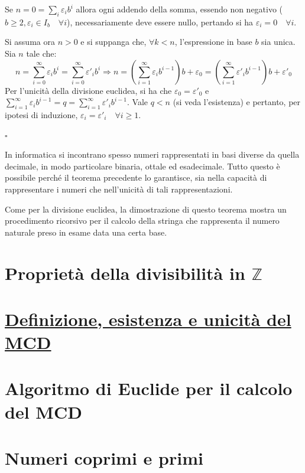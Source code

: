\documentclass[oneside]{book}
\theoremstyle{remark}
\newcommand{\cvd}{\begin{flushright}$\square$\end{flushright}} %
\begin{document}
\begin{tcolorbox}[enhanced, breakable, title={Teorema di rappresentazione dei naturali in base arbitraria}]
Se $n = 0 = \sum_{i} \varepsilon_i b^i$ allora ogni addendo della somma,
essendo non negativo ($b \geq 2, \varepsilon_i \in I_b \quad \forall i$), necessariamente deve essere nullo, pertando si
ha $\varepsilon_i = 0 \quad \forall i$.

Si assuma ora $n > 0$ e si suppanga che, $\forall k < n$, l'espressione
in base $b$ sia unica. Sia $n$ tale che:
\[
    n = \sum_{i=0}^{\infty}\varepsilon_i b^i = \sum_{i=0}^{\infty}\varepsilon'_i b^i \Longrightarrow
    n = \left(\sum_{i=1}^{\infty}\varepsilon_i b^{i-1}\right)b + \varepsilon_0 = \left(\sum_{i=1}^{\infty}\varepsilon'_i b^{i-1}\right)b + \varepsilon'_0
\]
Per l'unicità della divisione euclidea, si ha che $\varepsilon_0 = \varepsilon'_0$
e $\sum_{i=1}^{\infty}\varepsilon_i b^{i-1} = q = \sum_{i=1}^{\infty}\varepsilon'_i b^{i-1}$.
Vale $q < n$ (si veda l'esistenza) e pertanto, per ipotesi di induzione,
$\varepsilon_i = \varepsilon'_i \quad \forall i \geq 1$.
\cvd
\end{tcolorbox}
In informatica si incontrano spesso numeri rappresentati in basi
diverse da quella decimale, in modo particolare binaria, ottale
ed esadecimale. Tutto questo è possibile perché il teorema precedente
lo garantisce, sia nella capacità di rappresentare i numeri che
nell'unicità di tali rappresentazioni.

Come per la divisione euclidea, la dimostrazione di questo teorema
mostra un procedimento ricorsivo per il calcolo della stringa che
rappresenta il numero naturale preso in esame data una certa base.

\begin{tcolorbox}[enhanced, breakable, colback=red!30, colframe=red!30!black, title = {Algoritmo di conversione tra rappresentabilità dei naturali in basi diverse}]

\end{tcolorbox}


\section{Proprietà della divisibilità in $\mathbb{Z}$}
\section{\underline{Definizione, esistenza e unicità del MCD}}
\section{Algoritmo di Euclide per il calcolo del MCD}
\section{Numeri coprimi e primi}
\end{document}
